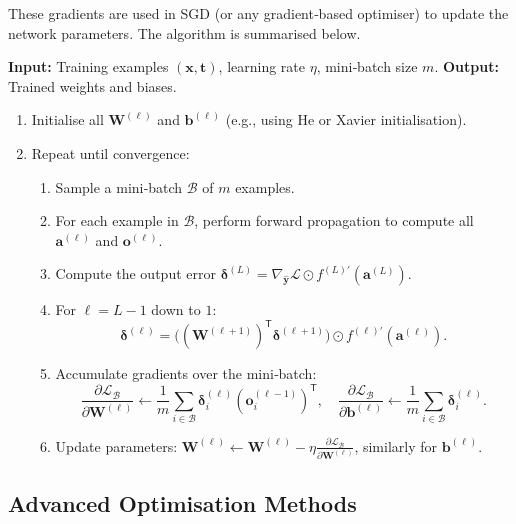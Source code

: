 \documentclass{tufte-handout}
\begin{document}
These gradients are used in SGD (or any gradient‑based optimiser) to update the network parameters. The algorithm is summarised below.

\begin{algorithm}[h]
    \caption{Backpropagation (stochastic / mini‑batch version)}
    \textbf{Input:} Training examples $(\mathbf{x}, \mathbf{t})$, learning rate $\eta$, mini‑batch size $m$.
    \textbf{Output:} Trained weights and biases.
    \begin{enumerate}
        \item Initialise all $\mathbf{W}^{(\ell)}$ and $\mathbf{b}^{(\ell)}$ (e.g., using He or Xavier initialisation).
        \item Repeat until convergence:
        \begin{enumerate}
            \item Sample a mini‑batch $\mathcal{B}$ of $m$ examples.
            \item For each example in $\mathcal{B}$, perform forward propagation to compute all $\mathbf{a}^{(\ell)}$ and $\mathbf{o}^{(\ell)}$.
            \item Compute the output error $\boldsymbol{\delta}^{(L)} = \nabla_{\hat{\mathbf{y}}}\mathcal{L} \odot f^{(L)'}(\mathbf{a}^{(L)})$.
            \item For $\ell = L-1$ down to $1$:
                \[
                \boldsymbol{\delta}^{(\ell)} = \bigl((\mathbf{W}^{(\ell+1)})^{\mathsf{T}} \boldsymbol{\delta}^{(\ell+1)}\bigr) \odot f^{(\ell)'}(\mathbf{a}^{(\ell)}).
                \]
            \item Accumulate gradients over the mini‑batch:
                \[
                \frac{\partial \mathcal{L}_{\mathcal{B}}}{\partial \mathbf{W}^{(\ell)}} \leftarrow \frac{1}{m}\sum_{i\in\mathcal{B}} \boldsymbol{\delta}_i^{(\ell)} (\mathbf{o}_i^{(\ell-1)})^{\mathsf{T}},\quad
                \frac{\partial \mathcal{L}_{\mathcal{B}}}{\partial \mathbf{b}^{(\ell)}} \leftarrow \frac{1}{m}\sum_{i\in\mathcal{B}} \boldsymbol{\delta}_i^{(\ell)}.
                \]
            \item Update parameters: $\mathbf{W}^{(\ell)} \leftarrow \mathbf{W}^{(\ell)} - \eta \frac{\partial \mathcal{L}_{\mathcal{B}}}{\partial \mathbf{W}^{(\ell)}}$, similarly for $\mathbf{b}^{(\ell)}$.
        \end{enumerate}
    \end{enumerate}
\end{algorithm}

\subsection{Advanced Optimisation Methods}
\end{document}
